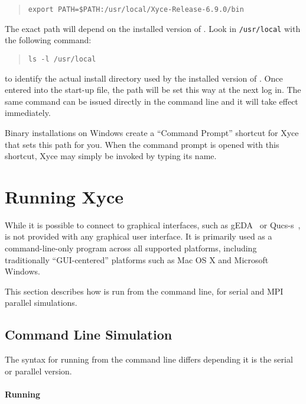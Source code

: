 \begin{quote}
  \verb+export PATH=$PATH:/usr/local/Xyce-Release-6.9.0/bin+
\end{quote}

The exact path will depend on the installed version of \Xyce{}.  Look in
\texttt{/usr/local} with the following command:
\begin{quote}
  \verb+ls -l /usr/local+
\end{quote}
to identify the actual install directory used by the installed version of
\Xyce{}.  Once entered into the start-up file, the path will be set this way at
the next log in.  The same command can be issued directly in the command line
and it will take effect immediately.

Binary installations on Windows create a ``Command Prompt'' shortcut
for Xyce that sets this path for you.  When the command prompt is
opened with this shortcut, Xyce may simply be invoked by typing its
name.

\section{Running Xyce}
\label{Running_Xyce}

While it is possible to connect \Xyce{} to graphical interfaces, such as
gEDA~\cite{geda} or Qucs-s~\cite{qucs-s}, \Xyce{} is not provided with any graphical user interface. It
is primarily used as a command-line-only program across all supported
platforms, including traditionally ``GUI-centered'' platforms such as Mac OS X
and Microsoft Windows.

This section describes how \Xyce{} is run from the command line, for serial and
MPI parallel simulations.

\subsection{Command Line Simulation}
\label{command_line_simulation}

The syntax for running \Xyce{} from the command line differs depending
it is the serial or parallel version.

\paragraph{Running \Xyce{}}

